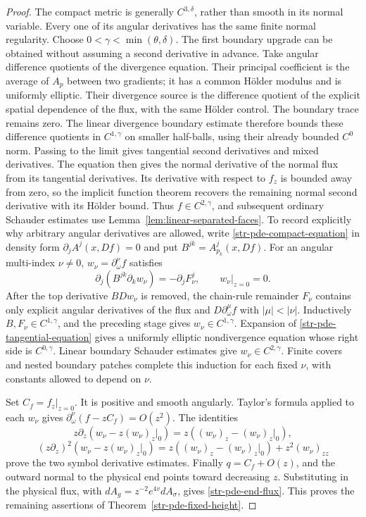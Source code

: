 \begin{proof}
The compact metric is generally $C^{3,\delta}$, rather than
smooth in its normal variable. Every one of its angular
derivatives has the same finite normal regularity. Choose
$0<\gamma<\min(\theta,\delta)$. The first boundary upgrade can be
obtained without assuming a second derivative in advance. Take angular
difference quotients of the divergence equation. Their principal
coefficient is the average of $A_p$ between two gradients; it has a
common H\"older modulus and is uniformly elliptic. Their divergence
source is the difference quotient of the explicit spatial dependence
of the flux, with the same H\"older control. The boundary trace remains
zero. The linear divergence boundary estimate
\cite[Theorem~9.1, p.~675, with $l=1$]{agmondouglisnirenberg1959}
therefore bounds these difference quotients in $C^{1,\gamma}$ on smaller
half-balls, using their already bounded $C^0$ norm. Passing to the limit
gives tangential second derivatives and mixed derivatives.
The equation then gives the normal derivative of the normal flux
from its tangential derivatives. Its derivative with respect to $f_z$
is bounded away from zero, so the implicit function theorem recovers
the remaining normal second derivative with its H\"older bound.
Thus $f\in C^{2,\gamma}$, and subsequent ordinary Schauder estimates
use Lemma~\ref{lem:linear-separated-faces}.
To record explicitly why arbitrary angular derivatives are
allowed, write \eqref{str-pde-compact-equation} in density form
$\partial_j A^j(x,Df)=0$ and put
$B^{jk}=A^j_{p_k}(x,Df)$. For an angular multi-index $\nu\ne0$,
$w_\nu=\partial_\omega^\nu f$ satisfies
\begin{equation}\label{str-pde-tangential-equation}
 \partial_j(B^{jk}\partial_k w_\nu)=-\partial_j F_\nu^j,
 \qquad w_\nu|_{z=0}=0.
\end{equation}
After the top derivative $B Dw_\nu$ is removed, the chain-rule
remainder $F_\nu$ contains only explicit angular derivatives
of the flux and $D\partial_\omega^\mu f$ with $|\mu|<|\nu|$.
Inductively $B,F_\nu\in C^{1,\gamma}$, and the preceding
stage gives $w_\nu\in C^{1,\gamma}$. Expansion of
\eqref{str-pde-tangential-equation} gives a uniformly elliptic
nondivergence equation whose right side is $C^{0,\gamma}$.
Linear boundary Schauder estimates give
$w_\nu\in C^{2,\gamma}$. Finite covers and nested boundary
patches complete this induction for each fixed $\nu$, with
constants allowed to depend on $\nu$.

Set $C_f=f_z|_{z=0}$. It is positive and smooth angularly.
Taylor's formula applied to each $w_\nu$ gives
$\partial_\omega^\nu(f-zC_f)=O(z^2)$. The identities
\[
 z\partial_z(w_\nu-z(w_\nu)_z|_0)
 =z((w_\nu)_z-(w_\nu)_z|_0),
\]
\[
 (z\partial_z)^2(w_\nu-z(w_\nu)_z|_0)
 =z((w_\nu)_z-(w_\nu)_z|_0)+z^2(w_\nu)_{zz}
\]
prove the two symbol derivative estimates. Finally
$q=C_f+O(z)$, and the outward normal to the physical end points
toward decreasing $z$. Substituting in the physical flux, with
$dA_g=z^{-2}e^{4v}dA_\sigma$, gives
\eqref{str-pde-end-flux}. This proves the remaining assertions
of Theorem~\ref{str-pde-fixed-height}.
\end{proof}

